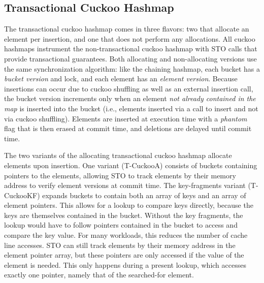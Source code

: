 \subsection{Transactional Cuckoo Hashmap}
The transactional cuckoo hashmap comes in three flavors: two that allocate an element per insertion, and one that does not perform any allocations. All cuckoo hashmaps instrument the non-transactional cuckoo hashmap with STO calls that provide transactional guarantees.
Both allocating and non-allocating versions use the same synchronization algorithm: like the chaining hashmap, each bucket has a \emph{bucket version} and lock, and each element has an \emph{element version}. Because insertions can occur due to cuckoo shuffling as well as an external insertion call, the bucket version increments only when an element \emph{not already contained in the map} is inserted into the bucket (i.e., elements inserted via a call to insert and not via cuckoo shuffling). Elements are inserted at execution time with a \emph{phantom} flag that is then erased at commit time, and deletions are delayed until commit time.

The two variants of the allocating transactional cuckoo hashmap allocate elements upon insertion. One variant (T-CuckooA) consists of buckets containing pointers to the elements, allowing STO to track elements by their memory address to verify element versions at commit time. The key-fragments variant (T-CuckooKF) expands buckets to contain both an array of keys and an array of element pointers. This allows for a lookup to compare keys directly, because the keys are themselves contained in the bucket. Without the key fragments, the lookup would have to follow pointers contained in the bucket to access and compare the key value. For many workloads, this reduces the number of cache line accesses. STO can still track elements by their memory address in the element pointer array, but these pointers are only accessed if the value of the element is needed. This only happens during a present lookup, which accesses exactly one pointer, namely that of the searched-for element.


